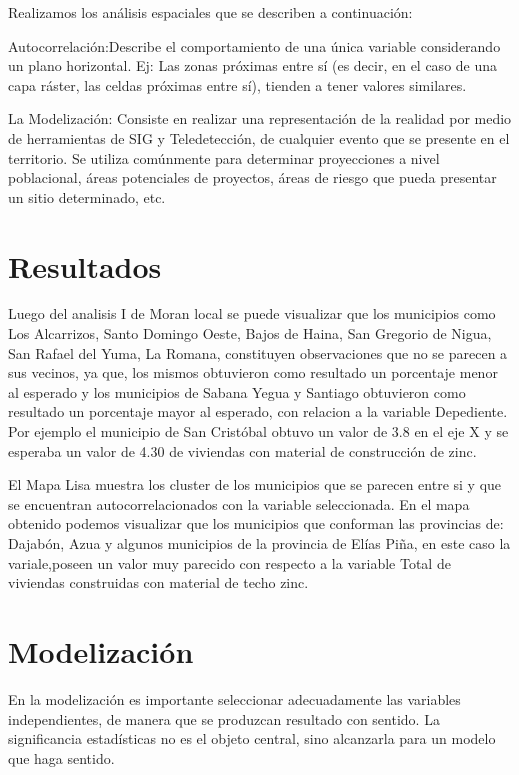 \documentclass[11pt,]{article}
\begin{document}
Realizamos los análisis espaciales que se describen a continuación:

Autocorrelación:Describe el comportamiento de una única variable
considerando un plano horizontal. Ej: Las zonas próximas entre sí (es
decir, en el caso de una capa ráster, las celdas próximas entre sí),
tienden a tener valores similares.

La Modelización: Consiste en realizar una representación de la realidad
por medio de herramientas de SIG y Teledetección, de cualquier evento
que se presente en el territorio. Se utiliza comúnmente para determinar
proyecciones a nivel poblacional, áreas potenciales de proyectos, áreas
de riesgo que pueda presentar un sitio determinado, etc.

\section{Resultados}\label{resultados}

Luego del analisis I de Moran local se puede visualizar que los
municipios como Los Alcarrizos, Santo Domingo Oeste, Bajos de Haina, San
Gregorio de Nigua, San Rafael del Yuma, La Romana, constituyen
observaciones que no se parecen a sus vecinos, ya que, los mismos
obtuvieron como resultado un porcentaje menor al esperado y los
municipios de Sabana Yegua y Santiago obtuvieron como resultado un
porcentaje mayor al esperado, con relacion a la variable Depediente. Por
ejemplo el municipio de San Cristóbal obtuvo un valor de 3.8 en el eje X
y se esperaba un valor de 4.30 de viviendas con material de construcción
de zinc.

El Mapa Lisa muestra los cluster de los municipios que se parecen entre
si y que se encuentran autocorrelacionados con la variable seleccionada.
En el mapa obtenido podemos visualizar que los municipios que conforman
las provincias de: Dajabón, Azua y algunos municipios de la provincia de
Elías Piña, en este caso la variale,poseen un valor muy parecido con
respecto a la variable Total de viviendas construidas con material de
techo zinc.

\section{Modelización}\label{modelizaciuxf3n}

En la modelización es importante seleccionar adecuadamente las variables
independientes, de manera que se produzcan resultado con sentido. La
significancia estadísticas no es el objeto central, sino alcanzarla para
un modelo que haga sentido.
\end{document}
